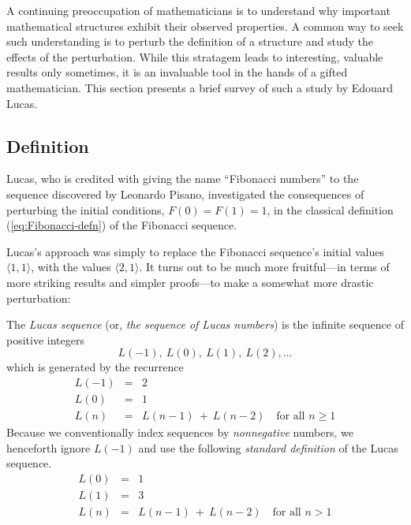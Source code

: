 
A continuing preoccupation of mathematicians is to understand why important mathematical structures exhibit their observed properties.  A common way to seek such understanding is to perturb the definition of a structure and study the effects of the perturbation.  While this stratagem leads to interesting, valuable results only sometimes, it is an invaluable tool in the hands of a gifted mathematician.  This section presents a brief survey of such a study by Edouard Lucas.   

\subsection{Definition}

Lucas, who is credited with giving the name ``Fibonacci numbers'' to the sequence discovered by Leonardo Pisano, investigated the consequences of perturbing the initial conditions, $F(0) = F(1) = 1$, in the classical definition (\ref{eq:Fibonacci-defn}) of the Fibonacci sequence.

\medskip

Lucas's approach was simply to replace the Fibonacci sequence's initial values $\langle 1,1 \rangle$, with the values $\langle 2,1 \rangle$.  It turns out to be much more fruitful---in terms of more striking results and simpler proofs---to make a somewhat more drastic perturbation:

\smallskip

 

The {\it Lucas sequence} (or, {\it the sequence of Lucas numbers}) is the infinite sequence of positive integers
\[ L(-1), \ L(0), \ L(1), \ L(2), \ldots \]
which is generated by the recurrence
\begin{eqnarray}
\nonumber
L(-1) & = & 2 \\
\label{eq:Lucas-defn-1}
L(0) & = & 1 \\
\nonumber
L(n) & = & L(n-1) \ + \ L(n-2) \ \ \ \mbox{ for all } n \geq 1
\end{eqnarray}
Because we conventionally index sequences by {\em nonnegative} numbers, we henceforth ignore $L(-1)$ and use the following {\em standard definition} of the Lucas sequence.
\begin{eqnarray}
\nonumber
L(0) & = & 1 \\
\label{eq:Lucas-defn-2}
L(1) & = & 3 \\
\nonumber
L(n) & = & L(n-1) \ + \ L(n-2) \ \ \ \mbox{ for all } n > 1
\end{eqnarray}

